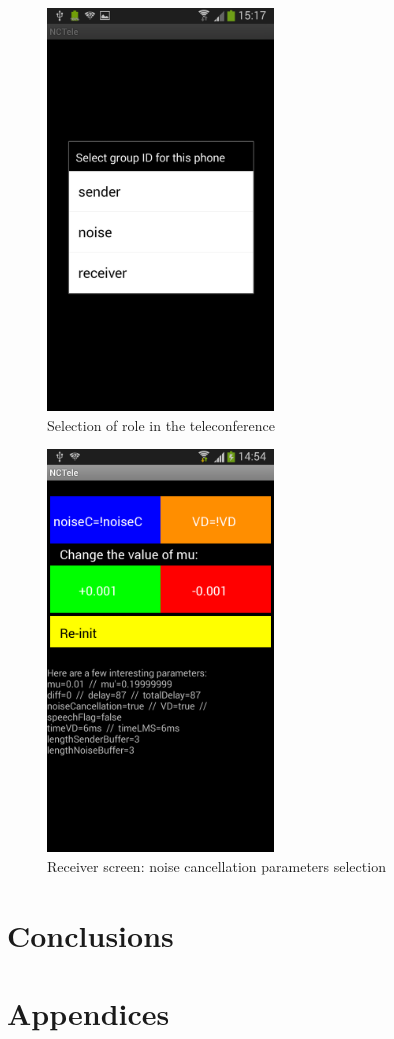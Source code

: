 \documentclass[11pt,a4paper,english]{book}  %
\theoremstyle{definition}  %
\theoremstyle{plain}  %
\theoremstyle{remark}  %
\begin{document}
		
		\begin{figure}[h]
		\centering
		\includegraphics[width=6cm]{images/android/selectionscreen.jpg}
		\caption{Selection of role in the teleconference}
		\label{fig:selection}
		\end{figure}
		
		
		\begin{figure}[h]
		\centering
		\includegraphics[width=6cm]{images/android/receiverscreen.jpg}
		\caption{Receiver screen: noise cancellation parameters selection}
		\label{fig:receiver}
		\end{figure}
	

\chapter{Conclusions}

\chapter{Appendices}
\label{sec:appendix}







\end{document}
